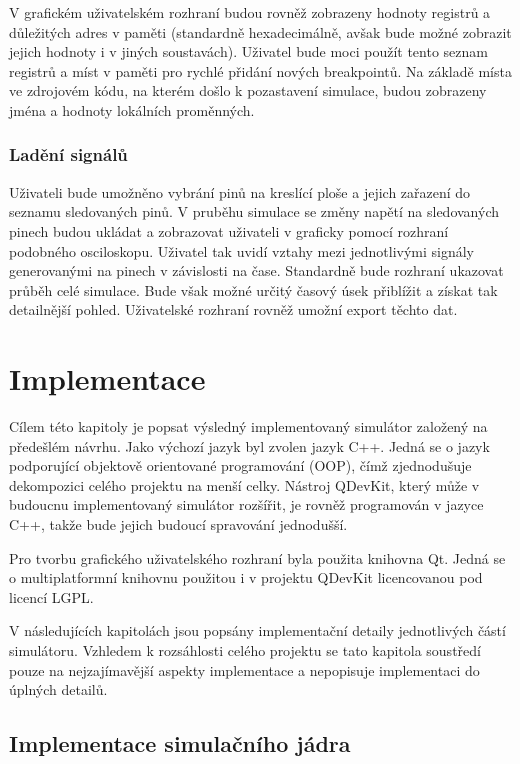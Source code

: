 V grafickém uživatelském rozhraní budou rovněž zobrazeny hodnoty registrů a důležitých adres v paměti (standardně hexadecimálně, avšak bude možné zobrazit jejich hodnoty i v jiných soustavách). Uživatel bude moci použít tento seznam registrů a míst v paměti pro rychlé přidání nových breakpointů. Na základě místa ve zdrojovém kódu, na kterém došlo k pozastavení simulace, budou zobrazeny jména a hodnoty lokálních proměnných.

\subsection{Ladění signálů}

Uživateli bude umožněno vybrání pinů na kreslící ploše a jejich zařazení do seznamu sledovaných pinů. V pruběhu simulace se změny napětí na sledovaných pinech budou ukládat a zobrazovat uživateli v graficky pomocí rozhraní podobného osciloskopu. Uživatel tak uvidí vztahy mezi jednotlivými signály generovanými na pinech v závislosti na čase. Standardně bude rozhraní ukazovat průběh celé simulace. Bude však možné určitý časový úsek přiblížit a získat tak detailnější pohled. Uživatelské rozhraní rovněž umožní export těchto dat.

\chapter{Implementace}

Cílem této kapitoly je popsat výsledný implementovaný simulátor založený na předešlém návrhu. Jako výchozí jazyk byl zvolen jazyk C++. Jedná se o jazyk podporující objektově orientované programování (OOP), čímž zjednodušuje dekompozici celého projektu na menší celky. Nástroj QDevKit, který může v budoucnu implementovaný simulátor rozšířit, je rovněž programován v jazyce C++, takže bude jejich budoucí spravování jednodušší.

Pro tvorbu grafického uživatelského rozhraní byla použita knihovna Qt. Jedná se o multiplatformní knihovnu použitou i v projektu QDevKit licencovanou pod licencí LGPL.

V následujících kapitolách jsou popsány implementační detaily jednotlivých částí simulátoru. Vzhledem k rozsáhlosti celého projektu se tato kapitola soustředí pouze na nejzajímavější aspekty implementace a nepopisuje implementaci do úplných detailů.

\section{Implementace simulačního jádra}


